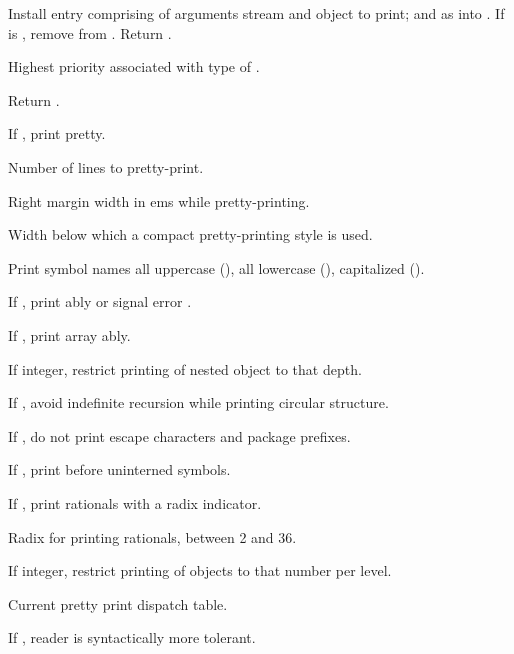 \begin{LIST}{1cm}
  {
  Install entry comprising  of arguments stream and
  object to print; and  as
   into . If 
  is \NIL, remove  from . Return \retval{\NIL}. 
  }

  {
  Highest priority  associated with type of
  . 
  }

  {
  Return .
  }

  {
  If \T, print pretty.
  }

  {
  Number of lines to pretty-print.
  }

  {
  Right margin width in ems while pretty-printing.
  }

  {
  Width below which a compact pretty-printing style is used.
  }

  {
  Print symbol names all uppercase (), all lowercase
  (), capitalized ().
  }

  {
  If \T, print ably or signal error
  . 
  }

  {
  If \T, print array ably.
  }

  {
  If integer, restrict printing of nested object to that depth.
  }

  {
  If \T, avoid indefinite recursion while printing circular
  structure. 
  }

  {
  If \NIL, do not print escape characters and package prefixes.
  }

  {
  If \T, print \kwd{:\#} before uninterned symbols.
  }

  {
  If \T, print rationals with a radix indicator.
  }

  {
  Radix for printing rationals, between 2 and 36.
  }

  {
  If integer, restrict printing of objects to that number per level.
  }

  {
  Current pretty print dispatch table.
  }

  {
  If \T, reader is syntactically more tolerant.
  }

\end{LIST}



